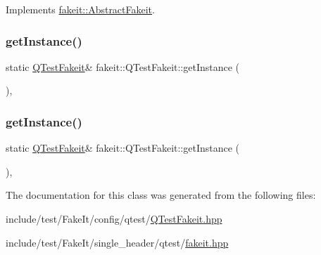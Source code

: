 Implements \mbox{\hyperlink{classfakeit_1_1AbstractFakeit_a9476180a503524d49d1978fbbc125b01}{fakeit\+::\+Abstract\+Fakeit}}.

\mbox{\label{classfakeit_1_1QTestFakeit_a328295d6e8b037e88084a8cfd5a5795d}} 
\subsubsection{\texorpdfstring{getInstance()}{getInstance()}\hspace{0.1cm}{\footnotesize\ttfamily [1/2]}}
{\footnotesize\ttfamily static \mbox{\hyperlink{classfakeit_1_1QTestFakeit}{Q\+Test\+Fakeit}}\& fakeit\+::\+Q\+Test\+Fakeit\+::get\+Instance (\begin{DoxyParamCaption}{ }\end{DoxyParamCaption})\hspace{0.3cm}{\ttfamily [inline]}, {\ttfamily [static]}}

\mbox{\label{classfakeit_1_1QTestFakeit_a328295d6e8b037e88084a8cfd5a5795d}} 
\subsubsection{\texorpdfstring{getInstance()}{getInstance()}\hspace{0.1cm}{\footnotesize\ttfamily [2/2]}}
{\footnotesize\ttfamily static \mbox{\hyperlink{classfakeit_1_1QTestFakeit}{Q\+Test\+Fakeit}}\& fakeit\+::\+Q\+Test\+Fakeit\+::get\+Instance (\begin{DoxyParamCaption}{ }\end{DoxyParamCaption})\hspace{0.3cm}{\ttfamily [inline]}, {\ttfamily [static]}}



The documentation for this class was generated from the following files\+:\begin{DoxyCompactItemize}
\item 
include/test/\+Fake\+It/config/qtest/\mbox{\hyperlink{QTestFakeit_8hpp}{Q\+Test\+Fakeit.\+hpp}}\item 
include/test/\+Fake\+It/single\+\_\+header/qtest/\mbox{\hyperlink{single__header_2qtest_2fakeit_8hpp}{fakeit.\+hpp}}\end{DoxyCompactItemize}
